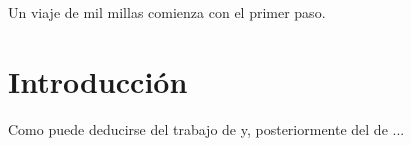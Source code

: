



\begin{savequote}[50mm]
Un viaje de mil millas comienza
con el primer paso.
\end{savequote}

\chapter{Introducción}
\ifpdf
    \graphicspath{{1_introduction/figures/PNG/}{1_introduction/figures/PDF/}{1_introduction/figures/}}
\else
    \graphicspath{{1_introduction/figures/EPS/}{1_introduction/figures/}}
\fi



Como puede deducirse del trabajo de \cite{Bailey} y, posteriormente del de
\cite{Ta}... 


